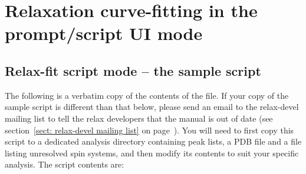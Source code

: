 \section{Relaxation curve-fitting in the prompt/script UI mode}



\subsection{Relax-fit script mode -- the sample script}

The following is a verbatim copy of the contents of the  file.  If your copy of the sample script is different than that below, please send an email to the relax-devel mailing list to tell the relax developers that the manual is out of date (see section~\ref{sect: relax-devel mailing list} on page~\pageref{sect: relax-devel mailing list}).  You will need to first copy this script to a dedicated analysis directory containing peak lists, a PDB file and a file listing unresolved spin systems, and then modify its contents to suit your specific analysis.  The script contents are:

